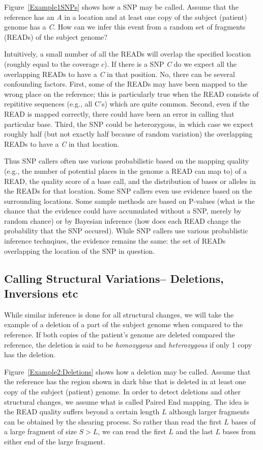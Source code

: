 \documentclass[10pt,fullpage]{article}
\begin{document}
Figure~\ref{Example1SNPs} shows how a SNP may be called.  Assume that
the reference has an {\em A} in a location and at least one copy
of the subject (patient) genome has a {\em C}.  How can we infer this
event from a random set of fragments (READs) of the subject genome?

Intuitively, a small number of all the READs will overlap the specified
location (roughly equal to the coverage $c$).  If there is a SNP
{\em C} do we expect all the overlapping READs to have a {\em C} in
that position.  No, there can be several confounding factors.  First,
some of the READs may have been mapped to the wrong place on the
reference; this is particularly true when the READ consists of 
repititive sequences (e.g., all C's) which are quite common.  Second,
even if the READ is mapped correctly, there could have been an error
in calling that particular base.  Third, the SNP could be heterozygous,
in which case we expect roughly half (but not exactly half because
of random variation) the overlapping READs to have a {\em C} in that
location.

Thus SNP callers often use various probabilistic based on the mapping
quality (e.g., the number of potential places in the genome a
READ can map to) of a READ, the quality score of a base call, and
the distribution of bases or alleles in the READs for that location.
Some SNP callers even use evidence based on the surrounding locations.
Some sample methods are based on P-values (what is the chance that
the evidence could have accumulated without a SNP, merely by random
chance) or by Bayesian inference (how does each READ change the 
probability that the SNP occured).   While SNP callers use various
probablistic inference technqiues, the evidence remains the same:
the set of READs overlapping the location of the SNP in question.
 
\subsection{Calling Structural Variations-- Deletions, Inversions etc}

While similar inference is done for all structural changes, 
we will take the example of a deletion of a part of the subject
genome when compared to the reference.  If both copies of
the patient's genome are deleted compared the reference, the 
deletion is said to be {\em homozygous} and {\em heterozygous} 
if only 1 copy  has the deletion.

Figure~\ref{Example2:Deletions} shows how a deletion may be called.  
Assume that the reference has the region shown in dark blue that
is deleted in at least one copy of the subject (patient) genome.
In order to detect deletions and other structural changes, we 
assume what is called Paired End mapping.  The idea is the READ
quality suffers beyond a certain length $L$ although larger 
fragments can be obtained by the shearing process.  So rather than
read the first $L$ bases of a large fragment of size $S > L$, we
can read the first $L$ and the last $L$ bases from either end of
the large fragment.  
\end{document}
